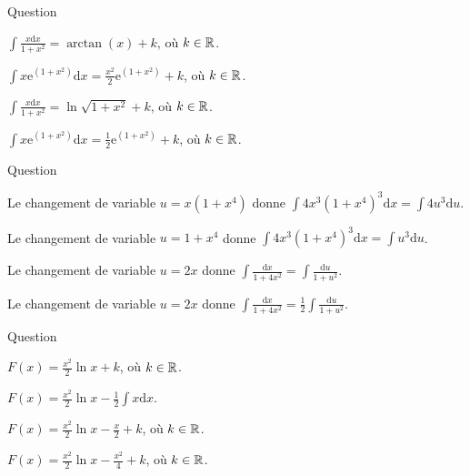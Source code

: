 \begin{multi}[multiple,feedback=
{Avec \(u=1+x^2\), on a : \(\mathrm{d}u=2x\mathrm{d}x\). D'où
\[\int \frac{x\mathrm{d}x}{1+x^2}=\frac{1}{2}\int \frac{\mathrm{d}u}{u}=\frac{1}{2}\ln (u)+k=\ln\sqrt{1+x^2}+k,\; k\in \Rr,\]
et 
\[\int x\mathrm{e}^{(1+x^2)}\mathrm{d}x=\frac{1}{2}\int \mathrm{e}^u\mathrm{d}u=\frac{1}{2}\mathrm{e}^u+k=\frac{1}{2}\mathrm{e}^{(1+x^2)}+k,\; k\in \Rr.\]
}]{Question}
    \item \(\displaystyle \int \frac{x\mathrm{d}x}{1+x^2}=\arctan (x)+k\), où \(k\in \mathbb{R}\).
    \item \(\displaystyle \int x\mathrm{e}^{(1+x^2)}\mathrm{d}x=\frac{x^2}{2}\mathrm{e}^{(1+x^2)}+k\), où \(k\in \mathbb{R}\).
    \item* \(\displaystyle \int \frac{x\mathrm{d}x}{1+x^2}=\ln\sqrt{1+x^2}+k\), où \(k\in \mathbb{R}\).
    \item* \(\displaystyle \int x\mathrm{e}^{(1+x^2)}\mathrm{d}x=\frac{1}{2}\mathrm{e}^{(1+x^2)}+k\), où \(k\in \mathbb{R}\).
\end{multi}


\begin{multi}[multiple,feedback=
{Avec \(u=1+x^4\), on a : \(\mathrm{d}u=4x^3\mathrm{d}x\). D'où \(\displaystyle \int 4x^3(1+x^4)^3\mathrm{d}x=\int u^3\mathrm{d}u\). De même, avec \(u=2x\), on a : \(\mathrm{d}u=2\mathrm{d}x\). D'où \(\displaystyle \int \frac{\mathrm{d}x}{1+4x^2}=\frac{1}{2}\int \frac{\mathrm{d}u}{1+u^2}\).
}]{Question}
    \item Le changement de variable \(\displaystyle u=x(1+x^4)\) donne \(\displaystyle \int 4x^3(1+x^4)^3\mathrm{d}x=\int 4u^3\mathrm{d}u\).
    \item* Le changement de variable \(\displaystyle u=1+x^4\) donne \(\displaystyle \int 4x^3(1+x^4)^3\mathrm{d}x=\int u^3\mathrm{d}u\).
    \item Le changement de variable \(\displaystyle u=2x\) donne \(\displaystyle \int \frac{\mathrm{d}x}{1+4x^2}=\int \frac{\mathrm{d}u}{1+u^2}\).
    \item* Le changement de variable \(\displaystyle u=2x\) donne \(\displaystyle \int \frac{\mathrm{d}x}{1+4x^2}=\frac{1}{2}\int \frac{\mathrm{d}u}{1+u^2}\).
\end{multi}


\begin{multi}[multiple,feedback=
{Une intégration par parties, avec \(u=\ln x\) et \(v=x^2/2\), donne
\[F(x)=\frac{x^2}{2}\ln x-\frac{1}{2}\int x\mathrm{d}x=\frac{x^2}{2}\ln x-\frac{x^2}{4}+k,\; k\in \Rr.\]
}]{Question}
    \item \(\displaystyle F(x)=\frac{x^2}{2}\ln x+k\), où \(k\in \mathbb{R}\).
    \item* \(\displaystyle F(x)=\frac{x^2}{2}\ln x-\frac{1}{2}\int x\mathrm{d}x\).
    \item \(\displaystyle F(x)=\frac{x^2}{2}\ln x-\frac{x}{2}+k\), où \(k\in \mathbb{R}\).
    \item* \(\displaystyle F(x)=\frac{x^2}{2}\ln x-\frac{x^2}{4}+k\), où \(k\in \mathbb{R}\).
\end{multi}


